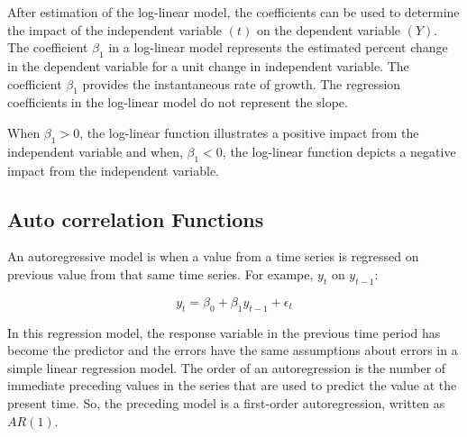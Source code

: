 After estimation of the log-linear model, the coefficients can be used to determine the impact of the independent variable $(t)$ on the dependent variable $(Y)$. The coefficient ${\beta}_1$ in a log-linear model represents the estimated percent change in the dependent variable for a unit change in independent variable. The coefficient ${\beta}_1$ provides the instantaneous rate of growth. The regression coefficients in the log-linear model do not represent the slope. 

When ${\beta}_1 > 0$, the log-linear function illustrates a positive impact from the independent variable and when, ${\beta}_1 < 0$, the log-linear function depicts a negative impact from the independent variable. 

\subsection{Auto correlation Functions}
An autoregressive model is when a value from a time series is regressed on previous value from that same time series. For exampe, $y_t$ on $y_{t-1}$:

\begin{equation}
y_t = \beta_{0} +\beta_{1}y_{t-1} +\epsilon_t
\end{equation}

In this regression model, the response variable in the previous time period has become the predictor and the errors have the same assumptions about errors in a simple linear regression model. The order of an autoregression is the number of immediate preceding values in the series that are used to predict the value at the present time. So, the preceding model is a first-order autoregression, written as $AR(1)$.

